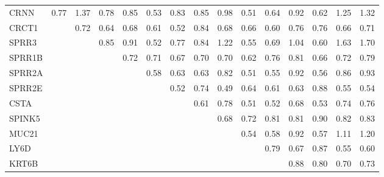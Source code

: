 \begin{longtable}{lrrrrrrrrrrrrrr}
\bottomrule
\endlastfoot
CRNN   &        0.77 &        1.37 &         0.78 &         0.85 &         0.53 &       0.83 &         0.85 &        0.98 &       0.51 &        0.64 &        0.92 &       0.62 &       1.25 &        1.32 \\
CRCT1  &             &        0.72 &         0.64 &         0.68 &         0.61 &       0.52 &         0.84 &        0.68 &       0.66 &        0.60 &        0.76 &       0.76 &       0.66 &        0.71 \\
SPRR3  &             &             &         0.85 &         0.91 &         0.52 &       0.77 &         0.84 &        1.22 &       0.55 &        0.69 &        1.04 &       0.60 &       1.63 &        1.70 \\
SPRR1B &             &             &              &         0.72 &         0.71 &       0.67 &         0.70 &        0.70 &       0.62 &        0.76 &        0.81 &       0.66 &       0.72 &        0.79 \\
SPRR2A &             &             &              &              &         0.58 &       0.63 &         0.63 &        0.82 &       0.51 &        0.55 &        0.92 &       0.56 &       0.86 &        0.93 \\
SPRR2E &             &             &              &              &              &       0.52 &         0.74 &        0.49 &       0.64 &        0.61 &        0.63 &       0.88 &       0.55 &        0.54 \\
CSTA   &             &             &              &              &              &            &         0.61 &        0.78 &       0.51 &        0.52 &        0.68 &       0.53 &       0.74 &        0.76 \\
SPINK5 &             &             &              &              &              &            &              &        0.68 &       0.72 &        0.81 &        0.81 &       0.90 &       0.82 &        0.83 \\
MUC21  &             &             &              &              &              &            &              &             &       0.54 &        0.58 &        0.92 &       0.57 &       1.11 &        1.20 \\
LY6D   &             &             &              &              &              &            &              &             &            &        0.79 &        0.67 &       0.87 &       0.55 &        0.60 \\
KRT6B  &             &             &              &              &              &            &              &             &            &             &        0.88 &       0.80 &       0.70 &        0.73 \\

\end{longtable}
